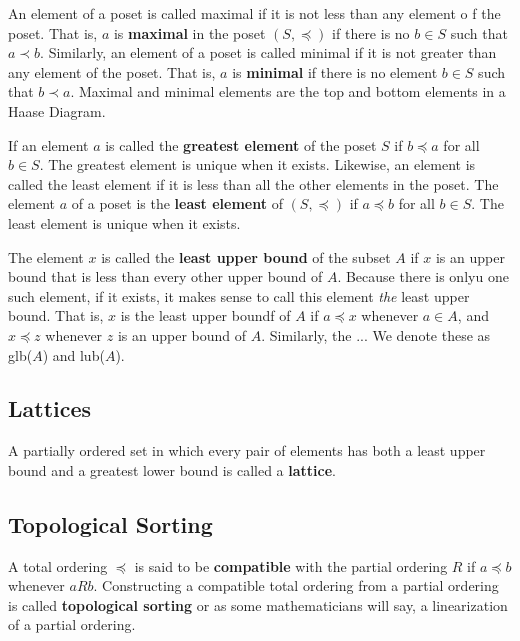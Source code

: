 \begin{definition}
An element of  a poset is called maximal if it is not less than any element o f the poset. That is, $a$ is \textbf{maximal} in the poset $(S,\preceq)$ if there is no $b\in S$ such that $a \prec b$. Similarly, an element of a poset is called minimal if it is not greater than any element of the poset. That is, $a$ is \textbf{minimal} if there is no element $b\in S$ such that $b \prec a$. Maximal and minimal elements are the top and bottom elements in a Haase Diagram.

If an element $a$ is called the \textbf{greatest element} of the poset $S$ if $b\preceq a$ for all $b \in S$. The greatest element is unique when it exists. Likewise, an element is called the least element if it is less than all the other elements in the poset. The element $a$ of a poset is the \textbf{least element} of $(S,\preceq)$ if $a\preceq b$ for all $b\in S$. The least element is unique when it exists.
\end{definition}

\begin{definition}
The element $x$ is called the \textbf{least upper bound} of the subset $A$ if $x$ is an upper bound that is less than every other upper bound of $A$. Because there is onlyu one such element, if it exists, it makes sense to call this element \textit{the} least upper bound. That is, $x$ is the least upper boundf of $A$ if $a\preceq x$ whenever $a \in A$, and $x \preceq z$ whenever $z$ is an upper bound of $A$. Similarly, the ...
We denote these as glb($A$) and lub($A$). 
\end{definition}

\subsection{Lattices}
\begin{definition}[Lattice]
A partially ordered set in which every pair of elements has both a least upper bound and a greatest lower bound is called a \textbf{lattice}.
\end{definition}

    \subsection {Topological Sorting}
\begin{definition}
A total ordering $\preceq$ is said to be \textbf{compatible} with the partial ordering $R$ if $a \preceq b$ whenever $aRb$. Constructing a compatible total ordering from a partial ordering is called \textbf{topological sorting} or as some mathematicians will say, a linearization of a partial ordering.
\end{definition}

